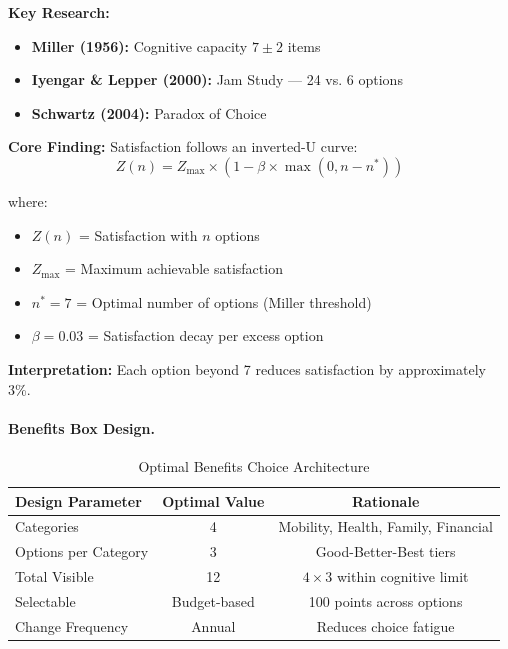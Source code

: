 \begin{tcolorbox}[colback=orange!5!white, colframe=orange!75!black,
    title=\textbf{Literature Foundation: Optimal Menu Size}]

\textbf{Key Research:}
\begin{itemize}[nosep]
    \item \textbf{Miller (1956):} Cognitive capacity $7 \pm 2$ items
    \item \textbf{Iyengar \& Lepper (2000):} Jam Study --- 24 vs. 6 options
    \item \textbf{Schwartz (2004):} Paradox of Choice
\end{itemize}

\textbf{Core Finding:} Satisfaction follows an inverted-U curve:
\begin{equation}
Z(n) = Z_{\max} \times (1 - \beta \times \max(0, n - n^*))
\label{eq:hhh-choice-satisfaction}
\end{equation}

where:
\begin{itemize}[nosep]
    \item $Z(n)$ = Satisfaction with $n$ options
    \item $Z_{\max}$ = Maximum achievable satisfaction
    \item $n^* = 7$ = Optimal number of options (Miller threshold)
    \item $\beta = 0.03$ = Satisfaction decay per excess option
\end{itemize}

\textbf{Interpretation:} Each option beyond 7 reduces satisfaction by approximately 3\%.

\end{tcolorbox}

\paragraph{Benefits Box Design.}

\begin{table}[htbp]
\centering
\caption{Optimal Benefits Choice Architecture}
\label{tab:hhh-choice-architecture}
\renewcommand{\arraystretch}{1.3}
\begin{tabular}{@{}lcc@{}}
\toprule
\textbf{Design Parameter} & \textbf{Optimal Value} & \textbf{Rationale} \\
\midrule
Categories & 4 & Mobility, Health, Family, Financial \\
Options per Category & 3 & Good-Better-Best tiers \\
Total Visible & 12 & $4 \times 3$ within cognitive limit \\
Selectable & Budget-based & 100 points across options \\
Change Frequency & Annual & Reduces choice fatigue \\
\bottomrule
\end{tabular}
\end{table}

